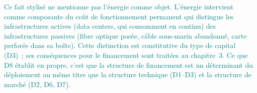 \textcolor{teal}{Ce fait stylisé ne mentionne pas l'énergie comme objet. L'énergie intervient comme composante du coût de fonctionnement permanent qui distingue les infrastructures actives (data centers, qui consomment en continu) des infrastructures passives (fibre optique posée, câble sous-marin abandonné, carte perforée dans sa boîte). Cette distinction est constitutive du type de capital (D3)~; ses conséquences pour le financement sont traitées au chapitre~3. Ce que D8 établit en propre, c'est que la structure de financement est un déterminant du déploiement au même titre que la structure technique (D1--D3) et la structure de marché (D2, D6, D7).}


